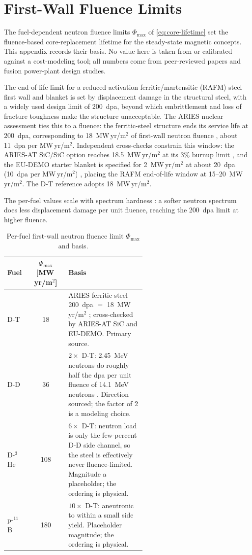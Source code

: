 \documentclass{article}
\begin{document}
\section{First-Wall Fluence Limits}
\label{app:wall-limits}

The fuel-dependent neutron fluence limits $\Phi_{\max}$ of
\cref{eq:core-lifetime} set the fluence-based core-replacement lifetime for
the steady-state magnetic concepts. This appendix records their basis. No
value here is taken from or calibrated against a cost-modeling tool; all
numbers come from peer-reviewed papers and fusion power-plant design studies.

The end-of-life limit for a reduced-activation ferritic/martensitic (RAFM)
steel first wall and blanket is set by displacement damage in the structural
steel, with a widely used design limit of 200~dpa, beyond which embrittlement
and loss of fracture toughness make the structure unacceptable. The ARIES
nuclear assessment ties this to a fluence: the ferritic-steel structure ends
its service life at 200~dpa, corresponding to 18~MW\,yr/m$^2$ of first-wall
neutron fluence \citep{elguebaly_ariesat, elguebaly_uwfdm1108}, about 11~dpa per
MW\,yr/m$^2$. Independent cross-checks constrain this window: the ARIES-AT
SiC/SiC option reaches 18.5~MW\,yr/m$^2$ at its 3\% burnup limit
\citep{elguebaly_ariesat}, and the EU-DEMO starter blanket is specified for
2~MW\,yr/m$^2$ at about 20~dpa (10~dpa per MW\,yr/m$^2$)
\citep{boccaccini_eudemo}, placing the RAFM end-of-life window at
15--20~MW\,yr/m$^2$. The D-T reference adopts 18~MW\,yr/m$^2$.

The per-fuel values scale with spectrum hardness \citep{konobeyev2017}: a
softer neutron spectrum does less displacement damage per unit fluence,
reaching the 200~dpa limit at
higher fluence.

\begin{table}[H]
\centering
\caption{Per-fuel first-wall neutron fluence limit $\Phi_{\max}$ and basis.}
\label{tab:fluence-limits}
\begin{tabular}{l c p{0.56\linewidth}}
\toprule
Fuel & $\Phi_{\max}$ [MW\,yr/m$^2$] & Basis \\
\midrule
D-T & 18 & ARIES ferritic-steel 200~dpa $=$ 18~MW\,yr/m$^2$ \citep{elguebaly_ariesat, elguebaly_uwfdm1108}; cross-checked by ARIES-AT SiC and EU-DEMO. Primary source. \\
D-D & 36 & $2\times$ D-T: 2.45~MeV neutrons do roughly half the dpa per unit fluence of 14.1~MeV neutrons \citep{konobeyev2017}. Direction sourced; the factor of 2 is a modeling choice. \\
D-${}^3$He & 108 & $6\times$ D-T: neutron load is only the few-percent D-D side channel, so the steel is effectively never fluence-limited. Magnitude a placeholder; the ordering is physical. \\
p-${}^{11}$B & 180 & $10\times$ D-T: aneutronic to within a small side yield. Placeholder magnitude; the ordering is physical. \\
\bottomrule
\end{tabular}
\end{table}
\end{document}
